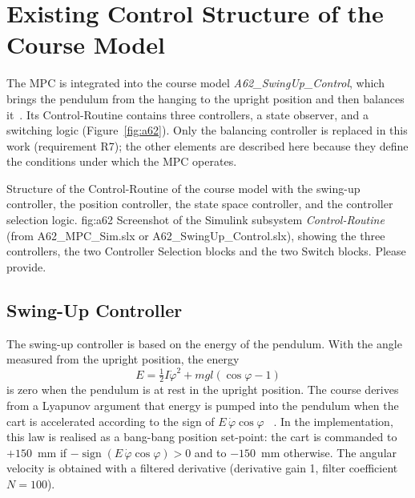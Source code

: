 \section{Existing Control Structure of the Course Model}
\label{sec:baseline}

The \ac{MPC} is integrated into the course model \emph{A62\_SwingUp\_Control},
which brings the pendulum from the hanging to the upright position and then
balances it~\cite{ln_manual}. Its Control-Routine contains three controllers,
a state observer, and a switching logic (Figure~\ref{fig:a62}). Only the
balancing controller is replaced in this work (requirement R7); the other
elements are described here because they define the conditions under which
the \ac{MPC} operates.

  {Structure of the Control-Routine of the course model with the swing-up controller, the position controller, the state space controller, and the controller selection logic.}
  {fig:a62}
  {Screenshot of the Simulink subsystem \emph{Control-Routine} (from A62\_MPC\_Sim.slx or A62\_SwingUp\_Control.slx), showing the three controllers, the two Controller Selection blocks and the two Switch blocks. Please provide.}

\subsection{Swing-Up Controller}
\label{subsec:swingup}

The swing-up controller is based on the energy of the pendulum. With the angle
measured from the upright position, the energy
\begin{equation}
  E = \tfrac{1}{2}I\dot{\varphi}^2 + mgl\left(\cos\varphi - 1\right)
  \label{eq:energy}
\end{equation}
is zero when the pendulum is at rest in the upright position. The course
derives from a Lyapunov argument that energy is pumped into the pendulum when
the cart is accelerated according to the sign of $E\,\dot{\varphi}\cos\varphi$
~\cite{ln_manual}. In the implementation, this law is realised as a
bang-bang position set-point: the cart is commanded to $+150$~mm if
$-\operatorname{sign}(E\,\dot{\varphi}\cos\varphi) > 0$ and to $-150$~mm
otherwise. The angular velocity is obtained with a filtered derivative
(derivative gain 1, filter coefficient $N = 100$).

